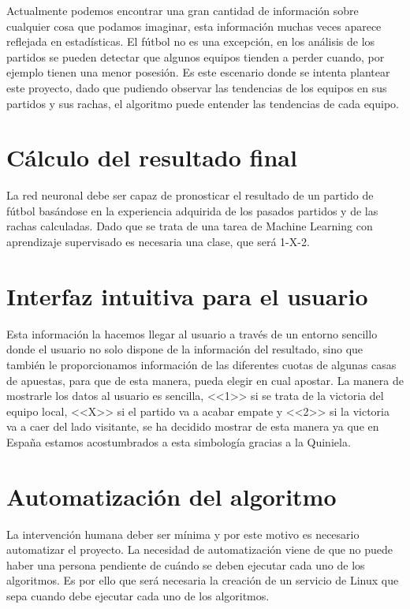 
Actualmente podemos encontrar una gran cantidad de información sobre cualquier cosa que podamos imaginar, esta información muchas veces aparece reflejada en estadísticas. El fútbol no es una excepción, en los análisis de los partidos se pueden detectar que algunos equipos tienden a perder cuando, por ejemplo tienen una menor posesión. Es este escenario donde se intenta plantear este proyecto, dado que pudiendo observar las tendencias de los equipos en sus partidos y sus rachas, el algoritmo puede entender las tendencias de cada equipo.

\section{Cálculo del resultado final}

La red neuronal debe ser capaz de pronosticar el resultado de un partido de fútbol basándose en la experiencia adquirida de los pasados partidos y de las rachas calculadas. Dado que se trata de una tarea de Machine Learning con aprendizaje supervisado es necesaria una clase, que será 1-X-2.

\section{Interfaz intuitiva para el usuario}

Esta información la hacemos llegar al usuario a través de un entorno sencillo donde el usuario no solo dispone de la información del resultado, sino que también le proporcionamos información de las diferentes cuotas de algunas casas de apuestas, para que de esta manera, pueda elegir en cual apostar. La manera de mostrarle los datos al usuario es sencilla, <<1>> si se trata de la victoria del equipo local, <<X>> si el partido va a acabar empate y <<2>> si la victoria va a caer del lado visitante, se ha decidido mostrar de esta manera ya que en España estamos acostumbrados a esta simbología gracias a la Quiniela.

\section{Automatización del algoritmo}
La intervención humana deber ser mínima y por este motivo es necesario automatizar el proyecto. La necesidad de automatización viene de que no puede haber una persona pendiente de cuándo se deben ejecutar cada uno de los algoritmos.
Es por ello que será necesaria la creación de un servicio de Linux que sepa cuando debe ejecutar cada uno de los algoritmos.

